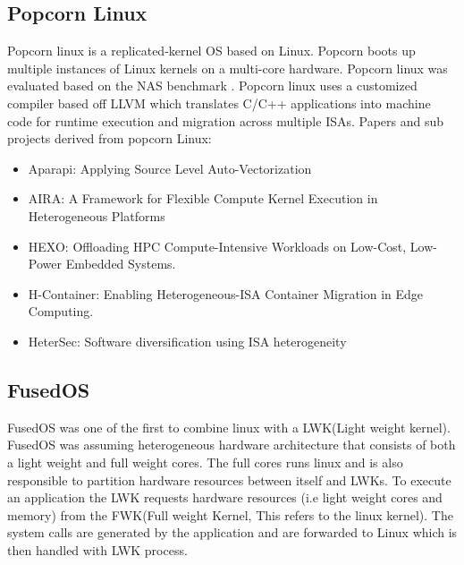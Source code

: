 \subsection{Popcorn Linux} %
Popcorn\cite{PopcornLinux} linux is a replicated-kernel OS based on Linux. Popcorn 
boots up multiple instances of Linux kernels on a 
multi-core hardware. Popcorn linux was evaluated 
based on the NAS benchmark \cite{NAS}. Popcorn 
linux uses a customized compiler based 
off LLVM which translates C/C++ applications 
into machine code for runtime execution and migration 
across multiple ISAs. Papers and sub projects 
derived from popcorn Linux: 
\begin{itemize}
  \item Aparapi: Applying Source Level Auto-Vectorization
  \item AIRA: A Framework for Flexible Compute Kernel Execution in Heterogeneous Platforms
  \item HEXO: Offloading HPC Compute-Intensive Workloads on Low-Cost, Low-Power Embedded Systems.
  \item H-Container: Enabling Heterogeneous-ISA Container Migration in Edge Computing.
  \item HeterSec: Software diversification using ISA heterogeneity
\end{itemize}



\subsection{FusedOS}
FusedOS was one of the first to combine 
linux with a LWK(Light weight kernel). FusedOS 
was assuming heterogeneous hardware architecture 
that consists of both a light weight and full 
weight cores. The full cores runs linux and 
is also responsible to partition hardware 
resources between itself and LWKs.
To execute an application the LWK requests 
hardware resources (i.e light weight cores and memory) 
from the FWK(Full weight Kernel, This refers to the 
linux kernel). The system calls are generated 
by the application and are forwarded to Linux 
which is then handled with LWK process. 

